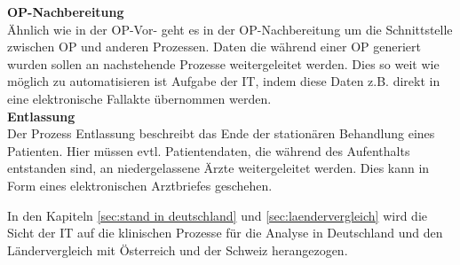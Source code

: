 	\textbf{OP-Nachbereitung}\\
		Ähnlich wie in der OP-Vor- geht es in der OP-Nachbereitung um die Schnittstelle zwischen OP und anderen Prozessen. Daten die während einer OP generiert wurden sollen an nachstehende Prozesse weitergeleitet werden. Dies so weit wie möglich zu automatisieren ist Aufgabe der IT, indem diese Daten z.B. direkt in eine elektronische Fallakte übernommen werden.
	\vspace{\parheadvspace}\\
	\textbf{Entlassung}\\
		Der Prozess Entlassung beschreibt das Ende der stationären Behandlung eines Patienten. Hier müssen evtl. Patientendaten, die während des Aufenthalts entstanden sind, an niedergelassene Ärzte weitergeleitet werden. Dies kann in Form eines elektronischen Arztbriefes geschehen. 

	In den Kapiteln \ref{sec:stand in deutschland} und \ref{sec:laendervergleich} wird die Sicht der IT auf die klinischen Prozesse für die Analyse in Deutschland und den Ländervergleich mit Österreich und der Schweiz herangezogen.
